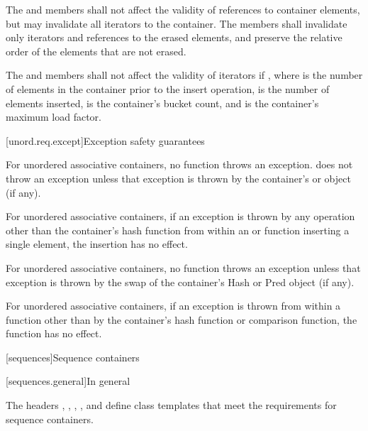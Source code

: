 \pnum
{}%
The  and  members shall not affect the validity of references to
container elements, but may invalidate all iterators to the
container.  The  members shall invalidate only iterators and
references to the erased elements, and preserve the relative order of the
elements that are not erased.

\pnum
{}%
%
The  and  members shall not affect the validity of iterators if
, where  is the number of elements in
the container prior to the insert operation,  is the
number of elements inserted,  is the container's bucket count, and
 is the container's maximum load factor.

[unord.req.except]{Exception safety guarantees}

\pnum
{}%
%
For unordered associative containers, no  function
throws an exception.  does not throw an
exception unless that exception is thrown by the container's  or
 object (if any).

\pnum
For unordered associative containers, if an exception is thrown by any
operation other than the container's hash function from within an
 or  function inserting a single element,
the insertion has no effect.

\pnum
For unordered associative containers, no  function throws
an exception unless that exception is thrown by the swap of the container's
Hash or Pred object (if any).

\pnum
{}%
%
For unordered associative containers, if an exception is thrown
from within a  function other than by the container's hash
function or comparison function, the  function has no effect.

[sequences]{Sequence containers}

[sequences.general]{In general}

\pnum
The headers , , ,
, and  define class templates that meet the
requirements for sequence containers.

